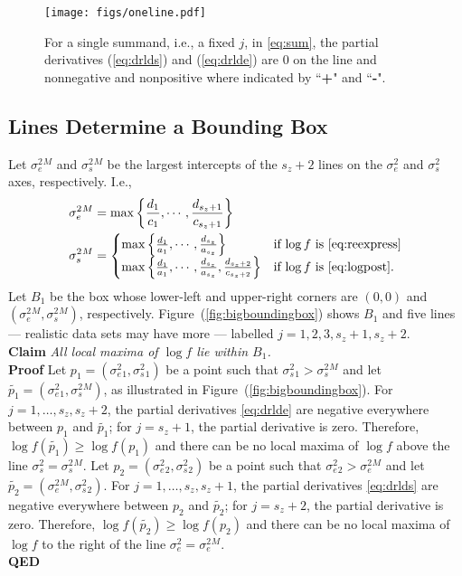 \documentclass[ejs]{imsart}
\newcommand{\RL}{f}
\newcommand{\logRL}{\log\RL}
\newcommand{\sigssq}{\sigma_s^2}
\newcommand{\sigesq}{\sigma_e^2}
\begin{document}
\begin{figure}[h]
	\centering
	\texttt{[image: figs/oneline.pdf]}
	\caption{For a single summand, i.e., a fixed $j$, in \eqref{eq:sum},
	              the partial derivatives (\ref{eq:drlds}) and (\ref{eq:drlde})
	              are 0 on the line and nonnegative and nonpositive
	              where indicated by ``\textbf{+}" and ``\textbf{-}".}
	\label{fig:oneline}
\end{figure}

\subsection{Lines Determine a Bounding Box}
\label{sec:boundingbox}

Let $\sigesq{}^M$ and $\sigssq{}^M$ be the largest intercepts of the $s_z+2$ lines on the $\sigesq$ and $\sigssq$ axes, respectively.  I.e.,
\begin{align*}
  \sigesq{}^M &= \max \left\{ \frac{d_1}{c_1}, \cdots, \frac{d_{s_z+1}}{c_{s_z+1}} \right\}\\
  \sigssq{}^M &= \begin{cases}
                             \max \left\{ \frac{d_1}{a_1}, \cdots, \frac{d_{s_z}}{a_{s_z}} \right\} &
                                  \text{if $\logRL$ is \eqref{eq:reexpress}}\\
                             \max \left\{ \frac{d_1}{a_1}, \cdots, \frac{d_{s_z}}{a_{s_z}}, \frac{d_{s_z+2}}{c_{s_z+2}} \right\} &
                                  \text{if $\logRL$ is \eqref{eq:logpost}}.
                           \end{cases}
\end{align*}
Let $B_1$ be the box whose lower-left and upper-right corners are $(0,0)$ and $(\sigesq{}^M,\sigssq{}^M)$, respectively.  Figure~(\ref{fig:bigboundingbox}) shows $B_1$ and five lines --- realistic data sets may have more --- labelled $j=1, 2, 3, s_z+1, s_z+2$.\\[5pt]
\textbf{Claim} \emph{All local maxima of $\logRL$ lie within $B_1$.}\\[5pt]
\textbf{Proof} Let $p_1 = (\sigesq{}_1, \sigssq{}_1)$ be a point such that $\sigssq{}_1 > \sigssq{}^M$ and let $\widetilde{p_1} = (\sigesq{}_1, \sigssq{}^M)$, as illustrated in Figure~(\ref{fig:bigboundingbox}).  For $j=1, \dots, s_z, s_z+2$, the partial derivatives \eqref{eq:drlde} are negative everywhere between $p_1$ and $\widetilde{p_1}$; for $j=s_z+1$, the partial derivative is zero.  Therefore, $\logRL(\widetilde{p_1}) \ge \logRL(p_1)$ and there can be no local maxima of $\logRL$ above the line $\sigssq = \sigssq{}^M$.  Let $p_2 = (\sigesq{}_2, \sigssq{}_2)$ be a point such that $\sigesq{}_2 > \sigesq{}^M$ and let $\widetilde{p_2} = (\sigesq{}^M, \sigssq{}_2)$.  For $j=1, \dots, s_z, s_z+1$, the partial derivatives \eqref{eq:drlds} are negative everywhere between $p_2$ and $\widetilde{p_2}$; for $j=s_z+2$, the partial derivative is zero.   Therefore, $\logRL(\widetilde{p_2}) \ge \logRL(p_2)$ and there can be no local maxima of $\logRL$ to the right of the line $\sigesq = \sigesq{}^M$.\\
\textbf{QED}\\
\end{document}
